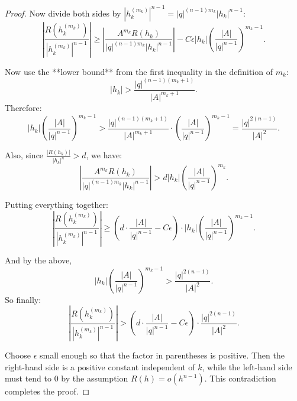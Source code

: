 \documentclass[10pt,a4paper]{amsart}
\begin{document}
\begin{proof}
Now divide both sides by \( |h_k^{(m_k)}|^{n-1} = |q|^{(n-1)m_k} |h_k|^{n-1} \):
\[
\left| \frac{R(h_k^{(m_k)})}{|h_k^{(m_k)}|^{n-1}} \right|
\geq \left| \frac{A^{m_k} R(h_k)}{|q|^{(n-1)m_k} |h_k|^{n-1}} \right|
- C \epsilon |h_k| \left( \frac{|A|}{|q|^{n-1}} \right)^{m_k - 1}.
\]

Now use the **lower bound** from the first inequality in the definition of \( m_k \):
\[
|h_k| > \frac{|q|^{(n-1)(m_k+1)}}{|A|^{m_k+1}}.
\]
Therefore:
\[
|h_k| \left( \frac{|A|}{|q|^{n-1}} \right)^{m_k - 1}
> \frac{|q|^{(n-1)(m_k+1)}}{|A|^{m_k+1}} \cdot \left( \frac{|A|}{|q|^{n-1}} \right)^{m_k - 1}
= \frac{|q|^{2(n-1)}}{|A|^2}.
\]

Also, since \( \frac{|R(h_k)|}{|h_k|^n} > d \), we have:
\[
\left| \frac{A^{m_k} R(h_k)}{|q|^{(n-1)m_k} |h_k|^{n-1}} \right|
> d |h_k| \left( \frac{|A|}{|q|^{n-1}} \right)^{m_k}.
\]

Putting everything together:
\[
\left| \frac{R(h_k^{(m_k)})}{|h_k^{(m_k)}|^{n-1}} \right|
\geq \left( d \cdot \frac{|A|}{|q|^{n-1}} - C \epsilon \right)
\cdot |h_k| \left( \frac{|A|}{|q|^{n-1}} \right)^{m_k - 1}.
\]

And by the above,
\[
|h_k| \left( \frac{|A|}{|q|^{n-1}} \right)^{m_k - 1}
> \frac{|q|^{2(n-1)}}{|A|^2}.
\]
So finally:
\[
\left| \frac{R(h_k^{(m_k)})}{|h_k^{(m_k)}|^{n-1}} \right|
> \left( d \cdot \frac{|A|}{|q|^{n-1}} - C \epsilon \right)
\cdot \frac{|q|^{2(n-1)}}{|A|^2}.
\]

Choose \( \epsilon \) small enough so that the factor in parentheses is positive. Then the right-hand side is a positive constant independent of \( k \), while the left-hand side must tend to 0 by the assumption \( R(h) = o(h^{n-1}) \). This contradiction completes the proof.
\end{proof}
\end{document}
